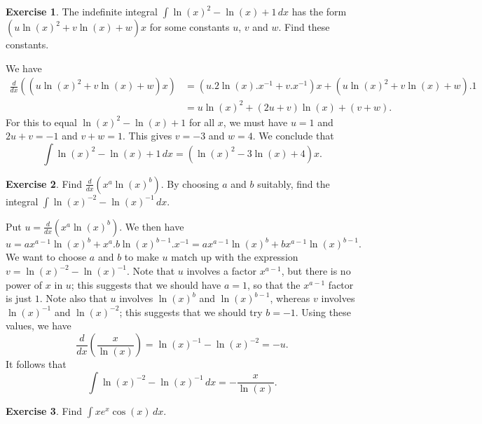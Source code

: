 \documentclass[a4paper]{amsart}
\theoremstyle{definition}
\newtheorem{exercise}{Exercise}[section]
\newenvironment{solution}{{\noindent \bf Solution:}}{}
\begin{document}
\begin{exercise}\label{ex-int-log-squared}
The indefinite integral $\int\ln(x)^2-\ln(x)+1\,dx$ has
 the form $(u\ln(x)^2+v\ln(x)+w)x$ for some constants $u$,
 $v$ and $w$.  Find these constants.
\end{exercise}
\begin{solution}
We have
 \begin{align*}
  \frac{d}{dx}((u\ln(x)^2+v\ln(x)+w)x) 
   &= (u.2\ln(x).x^{-1} + v.x^{-1})x +
      (u\ln(x)^2+v\ln(x)+w).1 \\
   &= u\ln(x)^2 + (2u+v)\ln(x) + (v+w).
 \end{align*}
 For this to equal $\ln(x)^2-\ln(x)+1$ for all $x$, we
 must have $u=1$ and $2u+v=-1$ and $v+w=1$.  This gives
 $v=-3$ and $w=4$.  We conclude that
 \[ \int \ln(x)^2 - \ln(x) + 1 \, dx =
     (\ln(x)^2-3\ln(x)+4)x.
 \]
\end{solution}
\begin{exercise}\label{ex-int-misc-ii}
Find $\frac{d}{dx}(x^a\ln(x)^b)$.  By choosing $a$ and $b$
 suitably, find the integral
 $\displaystyle \int \ln(x)^{-2} - \ln(x)^{-1}\, dx$.
\end{exercise}
\begin{solution}
Put $u=\frac{d}{dx}\left(x^a\ln(x)^b\right)$.  We then have
 \[ u = 
     a x^{a-1}\ln(x)^b + x^a.b\ln(x)^{b-1}.x^{-1} =
     a x^{a-1}\ln(x)^b + bx^{a-1}\ln(x)^{b-1}.
 \]
 We want to choose $a$ and $b$ to make $u$ match up with the
 expression $v=\ln(x)^{-2}-\ln(x)^{-1}$.  Note that $u$
 involves a factor $x^{a-1}$, but there is no power of $x$
 in $u$; this suggests that we should have $a=1$, so that
 the $x^{a-1}$ factor is just $1$.  Note also that $u$
 involves $\ln(x)^b$ and $\ln(x)^{b-1}$, whereas $v$
 involves $\ln(x)^{-1}$ and $\ln(x)^{-2}$; this suggests
 that we should try $b=-1$.  Using these values, we have
 \[ \frac{d}{dx}\left(\frac{x}{\ln(x)}\right) = 
     \ln(x)^{-1} - \ln(x)^{-2} = -u.
 \]
 It follows that 
 \[ \int \ln(x)^{-2} - \ln(x)^{-1}\, dx =
     -\frac{x}{\ln(x)}. 
 \]
\end{solution}
\begin{exercise}\label{ex-int-peo-i}
Find $\int x e^x\cos(x)\,dx$.
\end{exercise}
\end{document}
